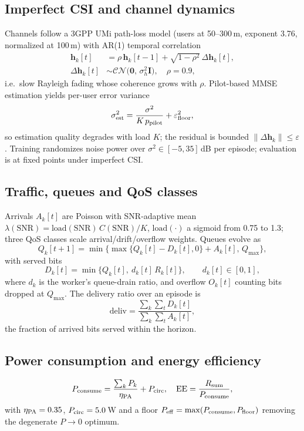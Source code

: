 \documentclass[journal]{IEEEtran}
\newcommand{\vect}[1]{\mathbf{#1}}
\begin{document}
\subsection{Imperfect CSI and channel dynamics}
Channels follow a 3GPP UMi path-loss model (users at 50--300\,m, exponent 3.76,
normalized at 100\,m) with AR(1) temporal correlation
\begin{align}
\vect{h}_k[t] &= \rho\, \vect{h}_k[t-1] + \sqrt{1-\rho^2}\,\Delta\vect{h}_k[t],\\
\Delta\vect{h}_k[t] &\sim \mathcal{CN}\!\big(\vect{0},\,\sigma_h^2\vect{I}\big), \quad \rho=0.9,
\label{eq:ar1}
\end{align}
i.e.\ slow Rayleigh fading whose coherence grows with $\rho$. Pilot-based MMSE
estimation yields per-user error variance
\begin{equation}
\sigma_{\rm est}^2 = \frac{\sigma^2}{K\,p_{\rm pilot}} + \varepsilon_{\rm floor}^2,
\label{eq:csi}
\end{equation}
so estimation quality degrades with load $K$; the residual is bounded
$\|\Delta\vect{h}_k\|\le\varepsilon$. Training randomizes noise power over
$\sigma^2 \in [-5,35]$\,dB per episode; evaluation is at fixed points under
imperfect CSI.

\subsection{Traffic, queues and QoS classes}
Arrivals $A_k[t]$ are Poisson with SNR-adaptive mean
$\lambda(\mathrm{SNR})=\mathrm{load}(\mathrm{SNR})\,C(\mathrm{SNR})/K$,
$\mathrm{load}(\cdot)$ a sigmoid from 0.75 to 1.3; three QoS classes scale
arrival/drift/overflow weights. Queues evolve as
\begin{equation}
Q_k[t{+}1] = \min\{\max\{Q_k[t]-D_k[t],0\}+A_k[t],\, Q_{\max}\},
\label{eq:queue}
\end{equation}
with served bits
\begin{equation}
D_k[t] = \min\{Q_k[t],\ d_k[t]\, R_k[t]\},\qquad d_k[t]\in[0,1],
\label{eq:served}
\end{equation}
where $d_k$ is the worker's queue-drain ratio, and overflow $O_k[t]$ counting
bits dropped at $Q_{\max}$. The delivery ratio over an episode is
\begin{equation}
\mathrm{deliv} = \frac{\sum_k \sum_t D_k[t]}{\sum_k \sum_t A_k[t]},
\label{eq:deliv}
\end{equation}
the fraction of arrived bits served within the horizon.

\subsection{Power consumption and energy efficiency}
\begin{equation}
P_{\rm consume} = \frac{\sum_k P_k}{\eta_{\rm PA}} + P_{\rm circ},\quad
\mathrm{EE} = \frac{R_{\rm sum}}{P_{\rm consume}},
\label{eq:ee}
\end{equation}
with $\eta_{\rm PA}=0.35$, $P_{\rm circ}=5.0$\,W and a floor
$P_{\rm eff}=\max(P_{\rm consume},P_{\rm floor})$ removing the degenerate
$P\to0$ optimum.
\end{document}
